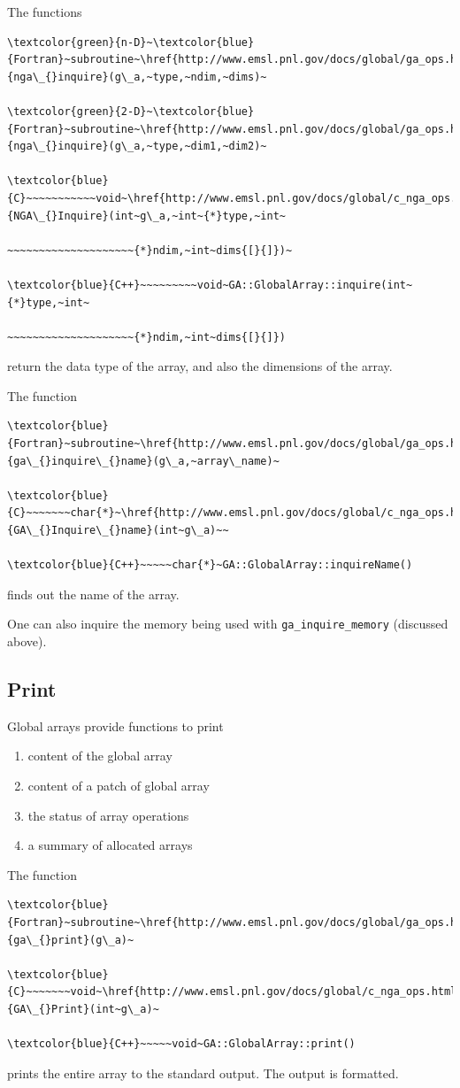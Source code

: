 The functions
\begin{verbatim}
\textcolor{green}{n-D}~\textcolor{blue}{Fortran}~subroutine~\href{http://www.emsl.pnl.gov/docs/global/ga_ops.html\#ga_inquire}{nga\_{}inquire}(g\_a,~type,~ndim,~dims)~

\textcolor{green}{2-D}~\textcolor{blue}{Fortran}~subroutine~\href{http://www.emsl.pnl.gov/docs/global/ga_ops.html\#ga_inquire}{nga\_{}inquire}(g\_a,~type,~dim1,~dim2)~

\textcolor{blue}{C}~~~~~~~~~~~void~\href{http://www.emsl.pnl.gov/docs/global/c_nga_ops.html\#ga_inquire}{NGA\_{}Inquire}(int~g\_a,~int~{*}type,~int~

~~~~~~~~~~~~~~~~~~~~{*}ndim,~int~dims{[}{]})~

\textcolor{blue}{C++}~~~~~~~~~void~GA::GlobalArray::inquire(int~{*}type,~int~

~~~~~~~~~~~~~~~~~~~~{*}ndim,~int~dims{[}{]})
\end{verbatim}
return the data type of the array, and also the dimensions of the
array.

The function
\begin{verbatim}
\textcolor{blue}{Fortran}~subroutine~\href{http://www.emsl.pnl.gov/docs/global/ga_ops.html\#ga_inquire_name}{ga\_{}inquire\_{}name}(g\_a,~array\_name)~

\textcolor{blue}{C}~~~~~~~char{*}~\href{http://www.emsl.pnl.gov/docs/global/c_nga_ops.html\#ga_inquire_name}{GA\_{}Inquire\_{}name}(int~g\_a)~~

\textcolor{blue}{C++}~~~~~char{*}~GA::GlobalArray::inquireName()
\end{verbatim}
finds out the name of the array.

One can also inquire the memory being used with \texttt{ga\_inquire\_memory}
(discussed above). 


\subsection{Print }

Global arrays provide functions to print
\begin{enumerate}
\item content of the global array 
\item content of a patch of global array 
\item the status of array operations 
\item a summary of allocated arrays
\end{enumerate}
The function
\begin{verbatim}
\textcolor{blue}{Fortran}~subroutine~\href{http://www.emsl.pnl.gov/docs/global/ga_ops.html\#ga_print}{ga\_{}print}(g\_a)~

\textcolor{blue}{C}~~~~~~~void~\href{http://www.emsl.pnl.gov/docs/global/c_nga_ops.html\#ga_print}{GA\_{}Print}(int~g\_a)~

\textcolor{blue}{C++}~~~~~void~GA::GlobalArray::print()
\end{verbatim}
prints the entire array to the standard output. The output is formatted.

